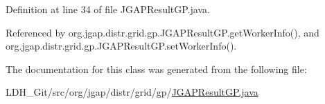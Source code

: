 Definition at line 34 of file J\-G\-A\-P\-Result\-G\-P.\-java.



Referenced by org.\-jgap.\-distr.\-grid.\-gp.\-J\-G\-A\-P\-Result\-G\-P.\-get\-Worker\-Info(), and org.\-jgap.\-distr.\-grid.\-gp.\-J\-G\-A\-P\-Result\-G\-P.\-set\-Worker\-Info().



The documentation for this class was generated from the following file\-:\begin{DoxyCompactItemize}
\item 
L\-D\-H\-\_\-\-Git/src/org/jgap/distr/grid/gp/\hyperlink{_j_g_a_p_result_g_p_8java}{J\-G\-A\-P\-Result\-G\-P.\-java}\end{DoxyCompactItemize}
